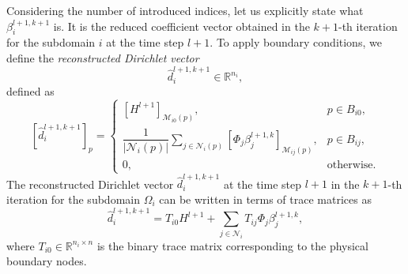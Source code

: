 \documentclass[a4paper, 11pt]{article}
\theoremstyle{plain}
\theoremstyle{definition}
\theoremstyle{remark}
\begin{document}
Considering the number of introduced indices, let us explicitly state what $\beta_{i}^{l+1, k+1}$ is. It is the 
reduced coefficient vector obtained in the $k+1$-th iteration for the subdomain $i$ at the time step $l+1$. 
To apply boundary conditions, we define the \textit{reconstructed Dirichlet vector} 
\begin{equation*}
    \hat{d}^{l+1, k+1}_{i} \in \mathbb{R}^{n_{i}},
\end{equation*}
defined as
\begin{equation*}
    \left[\hat{d}^{l+1, k+1}_{i}\right]_{p} = 
    \begin{cases}
        \left[H^{l+1}\right]_{\mathcal{M}_{i0}(p)}, & p\in B_{i0},\\[3pt]
        \dfrac{1}{\lvert \mathcal{N}_{i}(p)\rvert}\sum\limits_{j\in\mathcal{N}_{i}(p)}\left[\Phi_{j}\beta^{l+1, k}_{j}\right]_{\mathcal{M}_{ij}(p)}, & p\in B_{ij},\\
        0, & \text{otherwise}.
    \end{cases}
\end{equation*}
The reconstructed Dirichlet vector $\hat{d}^{l+1, k+1}_{i}$ at the time step $l+1$ in the $k+1$-th iteration for the subdomain $\Omega_i$ can be written in terms of trace matrices as
\begin{equation*}
    \hat{d}^{l+1, k+1}_{i} = T_{i0}H^{l+1} + \sum_{j\in\mathcal{N}_{i}}T_{ij}\Phi_{j}\beta^{l+1, k}_{j},
\end{equation*}
where $T_{i0}\in \mathbb{R}^{n_{i}\times n}$ is the binary trace matrix 
corresponding to the physical boundary nodes. 
\end{document}
